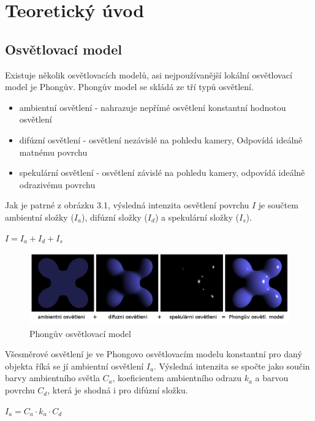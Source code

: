 \documentclass[11pt,twoside,a4paper]{book}
\begin{document}
\chapter{Teoretický úvod}

\section{Osvětlovací model}
Existuje několik osvětlovacích modelů, asi nejpoužívanější lokální osvětlovací model je Phongův. Phongův model se skládá ze tří typů osvětlení.
\begin{itemize}
\item ambientní osvětlení - nahrazuje nepřímé osvětlení konstantní hodnotou osvětlení
\item difúzní osvětlení - osvětlení nezávislé na pohledu kamery, Odpovídá ideálně matnému povrchu
\item spekulární osvětlení - osvětlení závislé na pohledu kamery, odpovídá ideálně odrazivému povrchu
\end{itemize}

Jak je patrné z obrázku 3.1, výsledná intenzita osvětlení povrchu $I$ je součtem ambientní složky ($I_a$), difúzní složky ($I_d$) a spekulární složky ($I_s$).
\begin{center}
$I = I_a + I_d + I_s$
\end{center}

\begin{center}
\begin{figure}[h!]
\includegraphics[width=150mm]{figures/phong.png}
\caption{Phongův osvětlovací model}
\end{figure}
\end{center}

Všesměrové osvětlení je ve Phongovo osvětlovacím modelu konstantní pro daný objekt\linebreak a říká se jí ambientní osvětlení $I_a$. Výsledná intenzita se spočte jako součin barvy ambientního světla $C_a$, koeficientem ambientního odrazu $k_a$ a barvou povrchu $C_d$, která je shodná i pro difúzní složku.
\begin{center}
$I_a = C_a \cdot k_a \cdot C_d$
\end{center}
\end{document}
